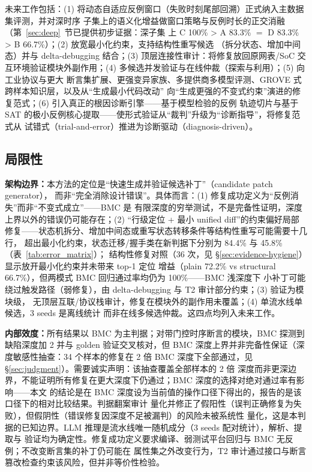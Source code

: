 \documentclass[twocolumn,10pt]{ctexart}
\begin{document}
未来工作包括：(1) 将动态自适应反例窗口（失败时刻尾部回溯）正式纳入主数据集评测，并对深时序
子集上的语义化增益做窗口策略与反例时长的正交消融（第~\ref{sec:deep}~节已提供初步证据：深子集
上 C 100\% > A 83.3\% $=$ D 83.3\% > B 66.7\%）；(2) 放宽最小化约束，支持结构性重写候选
（拆分状态、增加中间态）并与 delta-debugging 结合；(3) 顶层连接性审计：将修复放回原网表/SoC
交互环境验证模块外副作用；(4) 多候选并发验证与在线仲裁（探索与利用）；(5) 向工业协议与更大
断言集扩展、更强变异家族、多提供商多模型评测、GROVE 式跨样本知识层，以及从“生成最小代码改动”
向“生成更强的不变式约束”演进的修复范式；(6) 引入真正的根因诊断引擎——基于模型检验的反例
轨迹切片与基于 SAT 的极小反例核心提取——使形式验证从“裁判”升级为“诊断指导”，将修复范式从
试错式（trial-and-error）推进为诊断驱动（diagnosis-driven）。

\subsection{局限性}\label{sec:limitation}

\textbf{架构边界：}本方法的定位是“快速生成并验证候选补丁”（candidate patch generator），
而非“完全消除设计错误”。具体而言：(1) 修复成功定义为“反例消失”而非“不变式成立”——BMC 是
有限深度的穷举测试，不是完备性证明，深度上界以外的错误仍可能存在；(2) “行级定位 + 最小 unified
diff”的约束偏好局部修复——状态机拆分、增加中间态或重写状态转移条件等结构性重写可能需要十几行，
超出最小化约束，状态迁移/握手类在新判据下分别为 84.4\% 与 45.8\%（表~\ref{tab:error_matrix}）；
结构性修复对照（36 次，见 \S\ref{sec:evidence-hygiene}）显示放开最小化约束并未带来 top-1 定位
增益（plain 72.2\% vs structural 66.7\%），但两模式 BMC 回归通过率均仍为 100\%——BMC 浅深度下
小补丁可能绕过触发路径（弱修复），由 delta-debugging 与 T2 审计部分约束；(3) 验证为模块级，
无顶层互联/协议栈审计，修复在模块外的副作用未覆盖；(4) 单流水线单候选，3 seeds 是离线统计
而非在线多候选仲裁。这四点均列入未来工作。

\textbf{内部效度：}所有结果以 BMC 为主判据；对带门控时序断言的模块，BMC 探测到缺陷深度加 2
并与 golden 验证交叉核对，但 BMC 深度上界并非完备性保证（深度敏感性抽查：34 个样本的修复在
2 倍 BMC 深度下全部通过，见 \S\ref{sec:judgment}）。需要诚实声明：该抽查覆盖全部样本的 2 倍
深度而非更深边界，不能证明所有修复在更大深度下仍通过；BMC 深度的选择对绝对通过率有影响——本文
的结论是在 BMC 深度设为当前值的操作口径下得出的，报告的是该口径下的相对比较结果。判据翻案审计
量化并修正了假阳性（误判正确修复为失败），但假阴性（错误修复因深度不足被漏判）的风险未被系统性
量化，这是本判据的已知边界。LLM 推理是流水线唯一随机成分（3 seeds 配对统计），解析、提取与
验证均为确定性。修复成功定义要求编译、弱测试平台回归与 BMC 无反例；不改变断言集的补丁仍可能在
属性集之外改变行为，T2 审计通过接口与断言篡改检查约束该风险，但并非等价性检验。
\end{document}
